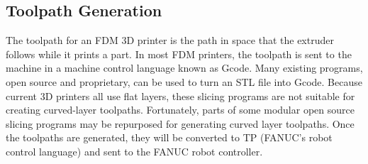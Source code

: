 \subsection{Toolpath Generation}

\indent

The toolpath for an FDM 3D printer is the path in space that the extruder follows while it prints a part. In most FDM printers, the toolpath is sent to the machine in a machine control language known as Gcode. Many existing programs, open source and proprietary, can be used to turn an STL file into Gcode. Because current 3D printers all use flat layers, these slicing programs are not suitable for creating curved-layer toolpaths. Fortunately, parts of some modular open source slicing programs may be repurposed for generating curved layer toolpaths. Once the toolpaths are generated, they will be converted to TP (FANUC's robot control language) and sent to the FANUC robot controller. \\
